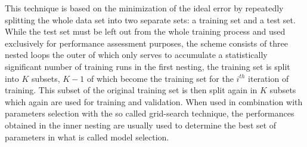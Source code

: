 This technique is based on the minimization of the ideal error by repeatedly 
splitting the whole data set into two separate sets: a training set and a test
set.
While the test set must be left out from the whole training process and
used exclusively for performance assessment purposes, the scheme consists of 
three nested loops the outer of which only serves to accumulate a statistically
significant number of training runs in the first nesting, the training set is
split into $K$ subsets, $K-1$ of which become the training set for the $i^{th}$
iteration of training.
This subset of the original training set is then split again in $K$ subsets
which again are used for training and validation.
When used in combination with parameters selection with the so called grid-search
technique, the performances obtained in the inner nesting are usually used to
determine the best set of parameters in what is called model selection.

